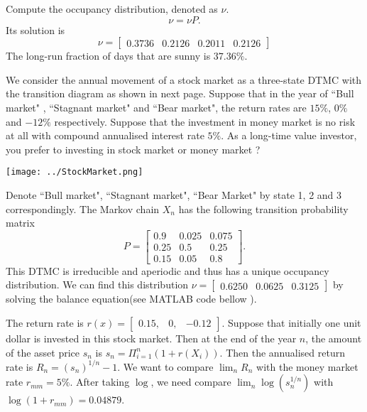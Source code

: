 \documentclass[  11pt]{article}
\begin{document}
\begin{ExerciseList}
\Answer\par
Compute the occupancy distribution, denoted as $\nu$.
\[
\nu=\nu P.
\]
Its solution is 
\[
\nu=\begin{bmatrix}
0.3736 & 0.2126 & 0.2011 & 0.2126
\end{bmatrix}
\]
The long-run fraction of days that are sunny is $37.36\%$.\\



\Exercise[difficulty=2]


   We consider  the annual  movement of a stock market as a three-state DTMC 
with the transition diagram as shown in next page.
Suppose that in the year of ``Bull market" , ``Stagnant market"
and ``Bear market",  the return rates  are $15\%$, $0\%$
and $-12\%$ respectively.
Suppose that the investment in money market is no risk at all
with compound annualised interest  rate $5\%$.
As a long-time value investor,  you prefer to investing 
in stock market or money market ? 
\begin{center}
\texttt{[image: ../StockMarket.png]}
\end{center}


\Answer 
Denote ``Bull market", ``Stagnant market", ``Bear Market" by state 1, 2 and 3 correspondingly. 
The Markov chain $X_n$ has the following 
transition probability matrix  $$P = \begin{bmatrix}
0.9 & 0.025 & 0.075 \\
0.25 & 0.5 & 0.25 \\
0.15 & 0.05 & 0.8 
\end{bmatrix}.$$
This DTMC is irreducible and aperiodic and thus has a unique occupancy distribution.
We can find this distribution $\nu = \begin{bmatrix}
0.6250 & 0.0625 & 0.3125
\end{bmatrix}$ by solving the balance equation(see MATLAB code bellow ).


 The return rate is   $r(x) = \begin{bmatrix}
0.15, & 0,  & -0.12
\end{bmatrix}$.
Suppose that initially one unit dollar is invested in this stock market.
Then at the end of the year $n$, the amount of the asset price $s_n$ is 
$s_n = \Pi_{i=1}^n(1+r(X_i))$. Then the annualised return rate is 
$ R_n= (s_n)^{1/n}-1$. We want to compare $\lim_n R_n$ with the money market rate $r_{mm}=5\%$.
After  taking $\log$, 
we need compare $ \lim_n \log (s_n^{1/n})$ with $\log(1+r_{mm})=0.04879$.
 

\end{ExerciseList}
\end{document}
